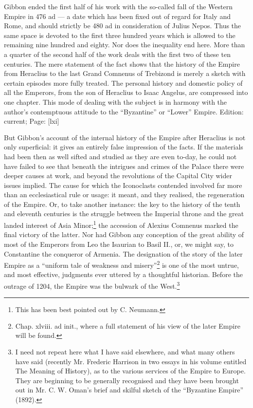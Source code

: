 Gibbon ended the first half of his work with the so-called fall of the Western Empire in 476 ad \texthebrew{—} a date which has been fixed out of regard for Italy and Rome, and should strictly be 480 ad in consideration of Julius Nepos. Thus the same space is devoted to the first three hundred years which is allowed to the remaining nine hundred and eighty. Nor does the inequality end here. More than a quarter of the second half of the work deals with the first two of these ten centuries. The mere statement of the fact shows that the history of the Empire from Heraclius to the last Grand Comnenus of Trebizond is merely a sketch with certain episodes more fully treated. The personal history and domestic policy of all the Emperors, from the son of Heraclius to Isaac Angelus, are compressed into one chapter. This mode of dealing with the subject is in harmony with the author\texthebrew{}’s contemptuous attitude to the \texthebrew{“}Byzantine\texthebrew{}” or \texthebrew{“}Lower\texthebrew{}” Empire.
Edition: current; Page: [lxi]

But Gibbon\texthebrew{}’s account of the internal history of the Empire after Heraclius is not only superficial: it gives an entirely false impression of the facts. If the materials had been then as well sifted and studied as they are even to-day, he could not have failed to see that beneath the intrigues and crimes of the Palace there were deeper causes at work, and beyond the revolutions of the Capital City wider issues implied. The cause for which the Iconoclasts contended involved far more than an ecclesiastical rule or usage: it meant, and they realised, the regeneration of the Empire. Or, to take another instance: the key to the history of the tenth and eleventh centuries is the struggle between the Imperial throne and the great landed interest of Asia Minor;\footnote{This has been best pointed out by C. Neumann.} the accession of Alexius Comnenus marked the final victory of the latter. Nor had Gibbon any conception of the great ability of most of the Emperors from Leo the Isaurian to Basil II., or, we might say, to Constantine the conqueror of Armenia. The designation of the story of the later Empire as a \texthebrew{“}uniform tale of weakness and misery\texthebrew{}”\footnote{Chap. xlviii. ad init., where a full statement of his view of the later Empire will be found.} is one of the most untrue, and most effective, judgments ever uttered by a thoughtful historian. Before the outrage of 1204, the Empire was the bulwark of the West.\footnote{I need not repeat here what I have said elsewhere, and what many others have said (recently Mr. Frederic Harrison in two essays in his volume entitled The Meaning of History), as to the various services of the Empire to Europe. They are beginning to be generally recognised and they have been brought out in Mr. C. W. Oman\texthebrew{}’s brief and skilful sketch of the \texthebrew{“}Byzantine Empire\texthebrew{}” (1892).}

